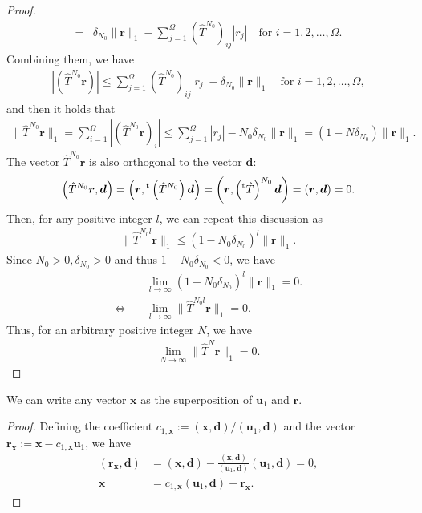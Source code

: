 \begin{proof}
\begin{align}
	=& \delta_{N_{0}}\|\bm{r}\|_{1} - \sum_{j=1}^{\Omega}\left(\hat{T}^{N_{0}}\right)_{ij}|r_{j}|\quad\text{for $i=1,2,\dots,\Omega$}.
	\end{align}
	Combining them, we have
	\begin{align}
	|\left(\hat{T}^{N_{0}}\bm{r}\right)| \leq \sum_{j=1}^{\Omega}\left(\hat{T}^{N_{0}}\right)_{ij}|r_{j}| - \delta_{N_{0}}\|\bm{r}\|_{1}\quad\text{for $i=1,2,\dots,\Omega$},
	\end{align}
	and then it holds that
	\begin{align}
	\|\hat{T}^{N_{0}}\bm{r}\|_{1} = \sum_{i=1}^{\Omega}|\left(\hat{T}^{N_{0}}\bm{r}\right)_{i}| \leq \sum_{j=1}^{\Omega}|r_{j}| - N_{0}\delta_{N_{0}}\|\bm{r}\|_{1} = (1-N\delta_{N_{0}})\|\bm{r}\|_{1}.
	\end{align}
	The vector $\hat{T}^{N_{0}}\bm{r}$ is also orthogonal to the vector $\bm{d}$:
	\begin{align}
	\left(\hat{T}^{N_{0}}\bm{r},\bm{d}\right) = \left(\bm{r},{}^{\rm t}\left(\hat{T}^{N_{0}}\right)\bm{d}\right) = \left(\bm{r},\left({}^{\rm t}\hat{T}\right)^{N_{0}}\bm{d}\right) = \left(\bm{r},\bm{d}\right) = 0.
	\end{align}
	Then, for any positive integer $l$, we can repeat this discussion as
	\begin{align}
	\|\hat{T}^{N_{0}l}\bm{r}\|_{1} \leq (1-N_{0}\delta_{N_{0}})^{l}\|\bm{r}\|_{1}.
	\end{align}
	Since $N_{0}>0, \delta_{N_{0}}>0$ and thus $1-N_{0}\delta_{N_{0}} < 0$, we have
	\begin{align}
	&\lim_{l\to\infty}(1-N_{0}\delta_{N_{0}})^{l}\|\bm{r}\|_{1} = 0.\\
	\Longleftrightarrow\quad&\lim_{l\to\infty}\|\hat{T}^{N_{0}l}\bm{r}\|_{1} = 0.
	\end{align}
	Thus, for an arbitrary positive integer $N$, we have
	\begin{align}
	\lim_{N\to\infty}\|\hat{T}^{N}\bm{r}\|_{1} = 0.
	\end{align}
\end{proof}

\begin{lemma}\label{theo:SupPos}
	We can write any vector $\bm{x}$ as the superposition of $\bm{u}_{1}$ and $\bm{r}$.
\end{lemma}

\begin{proof}
	Defining the coefficient $c_{1,\bm{x}}:=(\bm{x},\bm{d})/(\bm{u}_{1},\bm{d})$ and the vector $\bm{r}_{\bm{x}}:=\bm{x} - c_{1,\bm{x}}\bm{u}_{1}$, we have
	\begin{align}
	(\bm{r}_{\bm{x}},\bm{d}) &= (\bm{x},\bm{d}) - \frac{(\bm{x},\bm{d})}{(\bm{u}_{1},\bm{d})}(\bm{u}_{1},\bm{d}) = 0,\\
	\bm{x} &= c_{1,\bm{x}}(\bm{u}_{1},\bm{d}) + \bm{r}_{\bm{x}}.
	\end{align}
\end{proof}

